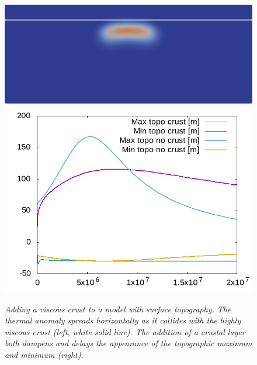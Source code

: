 \begin{figure}
  \centering
  \includegraphics[height=0.25\textwidth]{cookbooks/free_surface_with_crust/doc/free_surface_with_crust.png}
  \hfill
  \includegraphics[height=0.25\textwidth]{cookbooks/free_surface_with_crust/doc/topography.png}
  \caption{\it Adding a viscous crust to a model with surface topography. The
  thermal anomaly spreads horizontally as it collides with the highly viscous crust (left, white solid line). The addition of a crustal layer both dampens and delays the appearance of the topographic maximum and minimum (right).}
  \label{fig:freesurfaceWC}
\end{figure}
